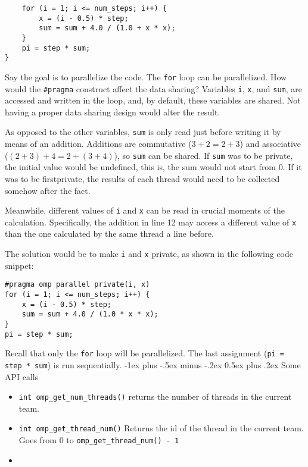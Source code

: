 \documentclass[10pt,landscape]{article}
\makeatletter
\renewcommand{\section}{\@startsection{section}{1}{0mm}%
                                {-1ex plus -.5ex minus -.2ex}%
                                {0.5ex plus .2ex}%
                                {\normalfont\large\bfseries}}
\makeatother
\begin{document}
\begin{multicols}{3}
\begin{verbatim}
    for (i = 1; i <= num_steps; i++) {
        x = (i - 0.5) * step;
        sum = sum + 4.0 / (1.0 + x * x);
    }
    pi = step * sum;
}
\end{verbatim}
\par
Say the goal is to parallelize the code. The \texttt{for} loop can be parallelized. How would the \texttt{\#pragma} construct affect the data sharing? Variables \texttt{i}, \texttt{x}, and \texttt{sum}, are accessed and written in the loop, and, by default, these variables are shared. Not having a proper data sharing design would alter the result.
\par
As opposed to the other variables, \texttt{sum} is only read just before writing it by means of an addition. Additions are commutative ($3+2=2+3$) and associative ($(2+3)+4=2+(3+4)$), so \texttt{sum} can be shared. If \texttt{sum} was to be private, the initial value would be undefined, this is, the sum would not start from 0. If it was to be firstprivate, the results of each thread would need to be collected somehow after the fact.
\par
Meanwhile, different values of \texttt{i} and \texttt{x} can be read in crucial moments of the calculation. Specifically, the addition in line 12 may access a different value of \texttt{x} than the one calculated by the same thread a line before.
\par
The solution would be to make \texttt{i} and \texttt{x} private, as shown in the following code snippet:
\begin{verbatim}
#pragma omp parallel private(i, x)
for (i = 1; i <= num_steps; i++) {
    x = (i - 0.5) * step;
    sum = sum + 4.0 / (1.0 * x * x);
}
pi = step * sum;
\end{verbatim}
\par
Recall that only the \texttt{for} loop will be parallelized. The last assignment (\texttt{pi = step * sum}) is run sequentially.
\section{Some API calls}
\begin{itemize}
    \item \texttt{int omp\_get\_num\_threads()} returns the number of threads in the current team.
    \item \texttt{int omp\_get\_thread\_num()} Returns the id of the thread in the current team. Goes from 0 to \texttt{omp\_get\_thread\_num() - 1}
    \item 
\end{itemize}

\end{multicols}
\end{document}
